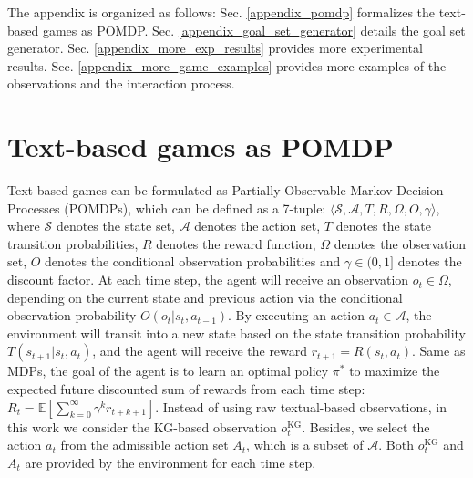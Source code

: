 \documentclass[11pt]{article}
\begin{document}
% 
% 




\clearpage
\onecolumn
\appendix
The appendix is organized as follows: Sec. \ref{appendix_pomdp}
formalizes the text-based games as POMDP. Sec. \ref{appendix_goal_set_generator} details the goal set generator. Sec. \ref{appendix_more_exp_results} provides more experimental results. Sec. \ref{appendix_more_game_examples} provides more examples of the observations and the interaction process. 

\section{Text-based games as POMDP \label{appendix_pomdp}}
Text-based games can be formulated as Partially Observable Markov Decision Processes (POMDPs), which can be defined as a 7-tuple: $\langle \mathcal{S}, \mathcal{A}, T, R, \Omega, O, \gamma \rangle$, where $\mathcal{S}$ denotes the state set, $\mathcal{A}$ denotes the action set, $T$ denotes the state transition probabilities, $R$ denotes the reward function, $\Omega$ denotes the observation set, $O$ denotes the conditional observation probabilities and $\gamma \in (0,1]$ denotes the discount factor. 
At each time step, the agent will receive an observation $o_t \in \Omega$, depending on the current state and previous action via the conditional observation probability $O(o_t|s_t,a_{t-1})$. By executing an action $a_t \in \mathcal{A}$, the environment will transit into a new state based on the state transition probability $T(s_{t+1}|s_t,a_t)$, and the agent will receive the reward $r_{t+1} = R(s_t,a_t)$. Same as MDPs, the goal of the agent is to learn an optimal policy $\pi^*$ to maximize the expected future discounted sum of rewards from each time step:  $R_t = \mathbb{E}[\sum_{k=0}^{\infty}\gamma^k r_{t+k+1}]$.
Instead of using raw textual-based observations, in this work we consider the KG-based observation $o_t^{\text{KG}}$. 
Besides, we select the action $a_t$ from the admissible action set $A_t$, which is a subset of $\mathcal{A}$. Both $o_t^{\text{KG}}$ and $A_t$ are provided by the environment for each time step. 
\end{document}
